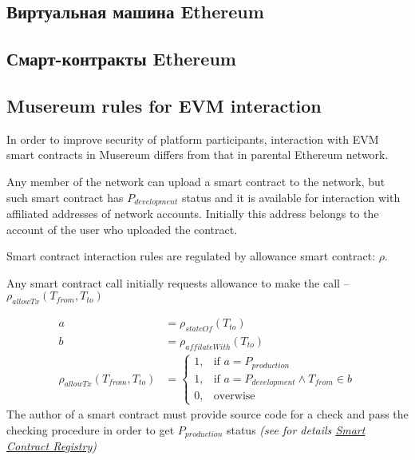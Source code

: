 \documentclass[12pt]{report}
\newcommand{\hlc}[1]{\colorbox{yellow!25}{#1}}
\begin{document}
\subsection{Виртуальная машина Ethereum}
\label{tech-blockchain-evm}
\subsection{Смарт-контракты Ethereum}
\label{tech-blockchain-contracts}

\subsection{Musereum rules for EVM interaction}
\label{tech-blockchain-rules}
\begin{multicols}{2}
In order to improve security of platform participants, interaction with EVM smart contracts in Musereum differs from that in parental Ethereum network.

Any member of the network can upload a smart contract to the network, but such smart contract has $P_{development}$ status and it is available for interaction with affiliated addresses of network accounts. Initially this address belongs to the account of the user who uploaded the contract.

Smart contract interaction rules are regulated by allowance smart contract: $\rho$.

Any smart contract call initially requests allowance to make the call – $\rho_{allowTx}(T_{from}, T_{to})$
\end{multicols}
\begin{align}
a &= \rho_{stateOf}(T_{to}) \nonumber\\
b &= \rho_{affilateWith}(T_{to}) \nonumber\\
\rho_{allowTx}(T_{from}, T_{to}) &= \begin{cases}1, & \text{if } a = P_{production} \\ 1, & \text{if } a = P_{development} \wedge T_{from} \in b \\ 0, & \text{overwise} \end{cases}
\end{align}
The author of a smart contract must provide source code for a check and pass the checking procedure in order to get $P_{production}$ status \textit{(see for details \hyperref[tech-apps-contracts-registry]{Smart Contract Registry})}

\def\Owner{Владелец контракта}
\def\Blockchain{Блокчейн}
\def\Registry{Реестр контрактов}
\def\LoadByteCode{Uploading byte code to blockchain}
\def\LoadSourceCode{Uploading source code}
\def\ValidationEnded{Code \hlc{Validation is} passed?}
\def\ChangeStatus{Changing smart contract state}
\end{document}
